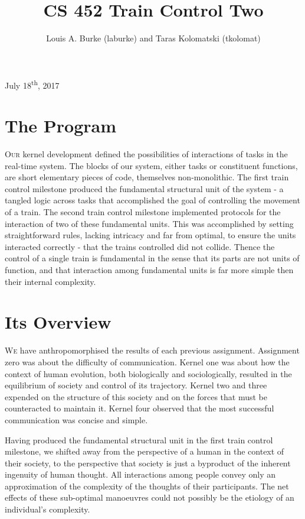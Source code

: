 \documentclass{amsart}
\title{CS 452 Train Control Two \vspace{-0.65cm}}
\date{Louis A. Burke (laburke) and Taras Kolomatski (tkolomat)}
\begin{document}
\maketitle

\begin{center}
\vspace{-0.58cm}
July 18\textsuperscript{th}, 2017
\end{center}

\section*{The Program}

\textsc{Our} kernel development defined the possibilities of interactions of tasks in the real-time system. The blocks of our system, either tasks or constituent functions, are short elementary pieces of code, themselves non-monolithic. The first train control milestone produced the fundamental structural unit of the system - a tangled logic across tasks that accomplished the goal of controlling the movement of a train. The second train control milestone implemented protocols for the interaction of two of these fundamental units. This was accomplished by setting straightforward rules, lacking intricacy and far from optimal, to ensure the units interacted correctly - that the trains controlled did not collide. Thence the control of a single train is fundamental in the sense that its parts are not units of function, and that interaction among fundamental units is far more simple then their internal complexity.

\section*{Its Overview}

\textsc{We} have anthropomorphised the results of each previous assignment. Assignment zero was about the difficulty of communication. Kernel one was about how the context of human evolution, both biologically and sociologically, resulted in the equilibrium of society and control of its trajectory. Kernel two and three expended on the structure of this society and on the forces that must be counteracted to maintain it. Kernel four observed that the most successful communication was concise and simple.

Having produced the fundamental structural unit in the first train control milestone, we shifted away from the perspective of a human in the context of their society, to the perspective that society is just a byproduct of the inherent ingenuity of human thought. All interactions among people convey only an approximation of the complexity of the thoughts of their participants. The net effects of these sub-optimal manoeuvres could not possibly be the etiology of an individual's complexity.
\end{document}
